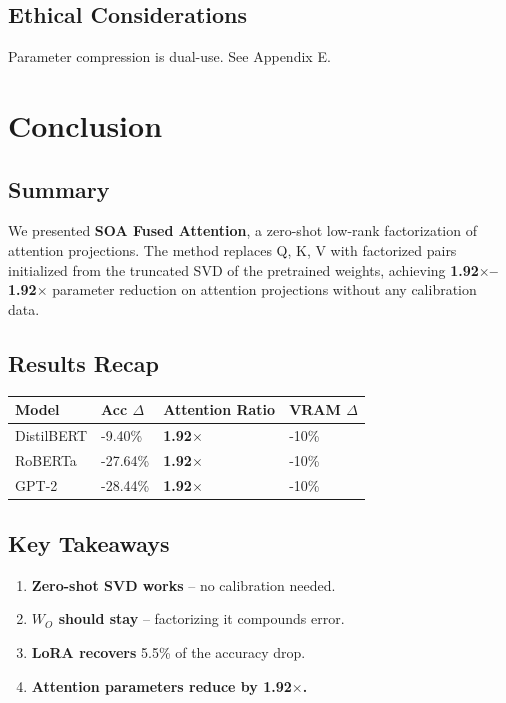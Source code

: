 \subsection{Ethical Considerations}

Parameter compression is dual-use. See Appendix E.



\section{Conclusion}

\subsection{Summary}

We presented \textbf{SOA Fused Attention}, a zero-shot low-rank factorization of 
attention projections. The method replaces Q, K, V with factorized pairs 
initialized from the truncated SVD of the pretrained weights, achieving 
\textbf{1.92$\times$--1.92$\times$} parameter reduction on attention projections 
without any calibration data.

\subsection{Results Recap}

\begin{table}[H]
\centering
\small
\begin{tabular}{llll}
\toprule
\textbf{Model} & \textbf{Acc $\Delta$} & \textbf{Attention Ratio} & \textbf{VRAM $\Delta$} \\
\midrule
DistilBERT & -9.40\% & \textbf{1.92$\times$} & -10\% \\
RoBERTa & -27.64\% & \textbf{1.92$\times$} & -10\% \\
GPT-2 & -28.44\% & \textbf{1.92$\times$} & -10\% \\
\bottomrule
\end{tabular}
\end{table}

\subsection{Key Takeaways}

\begin{enumerate}
\item \textbf{Zero-shot SVD works} -- no calibration needed.
\item \textbf{$W_O$ should stay} -- factorizing it compounds error.
\item \textbf{LoRA recovers} 5.5\% of the accuracy drop.
\item \textbf{Attention parameters reduce by 1.92$\times$.}

\end{enumerate}
